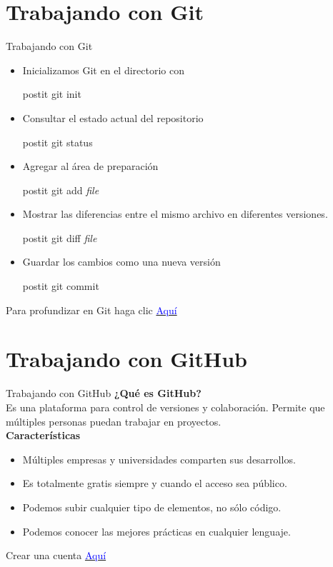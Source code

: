 \documentclass{beamer}
\begin{document}
\section{Trabajando con Git}
\begin{frame}{Trabajando con Git}
\begin{itemize}
\item Inicializamos Git en el directorio con \\
\begin{beamercolorbox}[sep=1mm]{postit}
git init 
\end{beamercolorbox}
\item Consultar el estado actual del repositorio \\
\begin{beamercolorbox}[sep=1mm]{postit}
git status
\end{beamercolorbox}
\item Agregar al área de preparación  \\
\begin{beamercolorbox}[sep=1mm]{postit}
git add \textit{file}
\end{beamercolorbox}
\item Mostrar las diferencias entre el mismo archivo en diferentes versiones. \\
\begin{beamercolorbox}[sep=1mm]{postit}
git diff \textit{file}
\end{beamercolorbox}
\item Guardar los cambios como una nueva versión \\
\begin{beamercolorbox}[sep=1mm]{postit}
git commit 
\end{beamercolorbox}
\end{itemize}
Para profundizar en Git haga clic  \href{https://git-scm.com/book/en/v2}{\textcolor{blue}{Aquí}}
\end{frame}

\section{Trabajando con GitHub}
\begin{frame}{Trabajando con GitHub}
\textbf{¿Qué es GitHub?}\\
Es una plataforma para control de versiones y colaboración. Permite que múltiples personas puedan trabajar en proyectos.\\
\vspace{2mm}
\textbf{Características}
\begin{itemize}
\item Múltiples empresas y universidades comparten sus desarrollos.
\item Es totalmente gratis siempre y cuando el acceso sea público.
\item Podemos subir cualquier tipo de elementos, no sólo código.
\item Podemos conocer las mejores prácticas en cualquier lenguaje.
\end{itemize}

Crear una cuenta \href{www.github.com}{\textcolor{blue}{Aquí}}
\end{frame}
\end{document}

